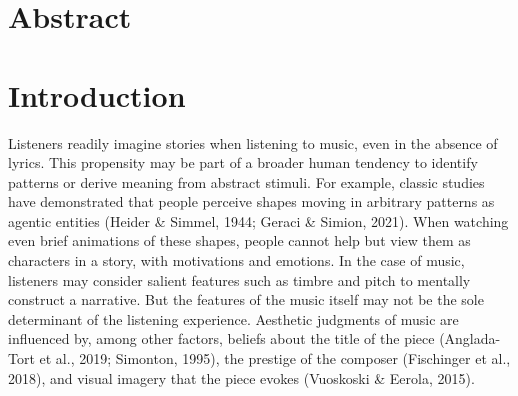 \documentclass[12pt,twoside]{reedthesis}
\begin{document}
    \tableofcontents
    \listoftables
    \listoffigures

    \chapter*{Abstract}
	
	

  \mainmatter %
  \pagestyle{fancyplain} %


    \chapter*{Introduction}

\doublespacing

Listeners readily imagine stories when listening to music, even in the absence of lyrics. This propensity may be part of a broader human tendency to identify patterns or derive meaning from abstract stimuli. For example, classic studies have demonstrated that people perceive shapes moving in arbitrary patterns as agentic entities (Heider \& Simmel, 1944; Geraci \& Simion, 2021). When watching even brief animations of these shapes, people cannot help but view them as characters in a story, with motivations and emotions. In the case of music, listeners may consider salient features such as timbre and pitch to mentally construct a narrative. But the features of the music itself may not be the sole determinant of the listening experience. Aesthetic judgments of music are influenced by, among other factors, beliefs about the title of the piece (Anglada-Tort et al., 2019; Simonton, 1995), the prestige of the composer (Fischinger et al., 2018), and visual imagery that the piece evokes (Vuoskoski \& Eerola, 2015). 
\end{document}
